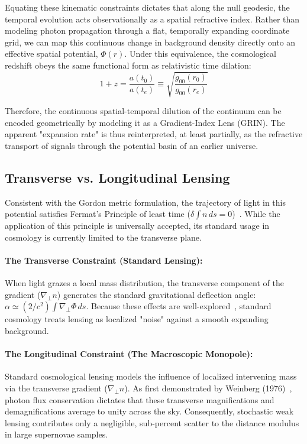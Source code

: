\documentclass[11pt]{article}
\begin{document}
Equating these kinematic constraints dictates that along the null geodesic, the temporal evolution acts observationally as a spatial refractive index. Rather than modeling photon propagation through a flat, temporally expanding coordinate grid, we can map this continuous change in background density directly onto an effective spatial potential, $\Phi(r)$. Under this equivalence, the cosmological redshift obeys the same functional form as relativistic time dilation:
\begin{equation}
1+z = \frac{a(t_0)}{a(t_e)} \equiv \sqrt{\frac{g_{00}(r_0)}{g_{00}(r_e)}}
\end{equation}

Therefore, the continuous spatial-temporal dilution of the continuum can be encoded geometrically by modeling it as a Gradient-Index Lens (GRIN). The apparent "expansion rate" is thus reinterpreted, at least partially, as the refractive transport of signals through the potential basin of an earlier universe.

\subsection{Transverse vs. Longitudinal Lensing}
Consistent with the Gordon metric formulation, the trajectory of light in this potential satisfies Fermat's Principle of least time ($\delta \int n \, ds = 0$)~\cite{BornWolf}. While the application of this principle is universally accepted, its standard usage in cosmology is currently limited to the transverse plane.

\paragraph{The Transverse Constraint (Standard Lensing):}
When light grazes a local mass distribution, the transverse component of the gradient ($\nabla_{\perp} n$) generates the standard gravitational deflection angle: $\alpha \simeq (2/c^2) \int \nabla_{\perp} \Phi \, ds$. Because these effects are well-explored~\cite{Bartelmann2001}, standard cosmology treats lensing as localized "noise" against a smooth expanding background.

\paragraph{The Longitudinal Constraint (The Macroscopic Monopole):}
Standard cosmological lensing models the influence of localized intervening mass via the transverse gradient ($\nabla_{\perp} n$). As first demonstrated by Weinberg (1976)~\cite{Weinberg1976}, photon flux conservation dictates that these transverse magnifications and demagnifications average to unity across the sky. Consequently, stochastic weak lensing contributes only a negligible, sub-percent scatter to the distance modulus in large supernovae samples.  
\end{document}
